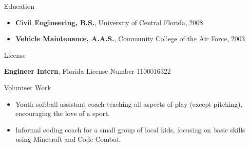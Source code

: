 \documentclass[]{mcdowellcv}
\begin{document}
\begin{cvsection}{Education}
	\begin{cvsubsection}{}{}{}
		\begin{itemize}
			\item \textbf{Civil Engineering, B.S.}, University of Central Florida, 2008
			\item \textbf{Vehicle Maintenance, A.A.S.}, Community College of the Air Force, 2003
		\end{itemize}
	\end{cvsubsection}
\end{cvsection}
\begin{cvsection}{License}
	\begin{cvsubsection}{}{}{}
		\textbf{Engineer Intern}, Florida License Number 1100016322
	\end{cvsubsection}
\end{cvsection}
\begin{cvsection}{Volunteer Work}
	\begin{cvsubsection}{}{}{}
		\begin{itemize}
			\item Youth softball assistant coach teaching all aspects of play (except pitching),  encouraging the love of a sport.
			\item Informal coding coach for a small group of local kids, focusing on basic skills using Minecraft and Code Combat.
		\end{itemize}
	\end{cvsubsection}
\end{cvsection}
\end{document}

